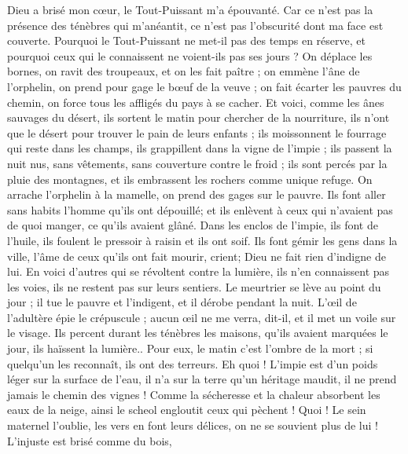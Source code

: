 \begin{multicols}{2}
Dieu a brisé mon cœur, le Tout-Puissant m'a épouvanté.
Car ce n'est pas la présence des ténèbres qui m'anéantit, ce n'est pas l'obscurité dont ma face est couverte.
\VerseOne{}Pourquoi le Tout-Puissant ne met-il pas des temps en réserve, et pourquoi ceux qui le connaissent ne voient-ils pas ses jours ?
On déplace les bornes, on ravit des troupeaux, et on les fait paître ;
on emmène l'âne de l'orphelin, on prend pour gage le bœuf de la veuve ;
on fait écarter les pauvres du chemin, on force tous les affligés du pays à se cacher.
Et voici, comme les ânes sauvages du désert, ils sortent le matin pour chercher de la nourriture, ils n'ont que le désert pour trouver le pain de leurs enfants ;
ils moissonnent le fourrage qui reste dans les champs, ils grappillent dans la vigne de l'impie ;
ils passent la nuit nus, sans vêtements, sans couverture contre le froid ;
ils sont percés par la pluie des montagnes, et ils embrassent les rochers comme unique refuge.
On arrache l'orphelin à la mamelle, on prend des gages sur le pauvre.
Ils font aller sans habits l'homme qu'ils ont dépouillé; et ils enlèvent à ceux qui n'avaient pas de quoi manger, ce qu'ils avaient glâné.
Dans les enclos de l'impie, ils font de l'huile, ils foulent le pressoir à raisin et ils ont soif.
Ils font gémir les gens dans la ville, l'âme de ceux qu'ils ont fait mourir, crient; Dieu ne fait rien d'indigne de lui.
En voici d'autres qui se révoltent contre la lumière, ils n'en connaissent pas les voies, ils ne restent pas sur leurs sentiers.
Le meurtrier se lève au point du jour ; il tue le pauvre et l'indigent, et il dérobe pendant la nuit.
L'œil de l'adultère épie le crépuscule ; aucun œil ne me verra, dit-il, et il met un voile sur le visage.
Ils percent durant les ténèbres les maisons, qu'ils avaient marquées le jour, ils haïssent la lumière..
Pour eux, le matin c'est l'ombre de la mort ; si quelqu'un les reconnaît, ils ont des terreurs.
Eh quoi ! L'impie est d'un poids léger sur la surface de l'eau, il n'a sur la terre qu'un héritage maudit, il ne prend jamais le chemin des vignes !
Comme la sécheresse et la chaleur absorbent les eaux de la neige, ainsi le scheol engloutit ceux qui pèchent !
Quoi ! Le sein maternel l'oublie, les vers en font leurs délices, on ne se souvient plus de lui ! L'injuste est brisé comme du bois,

\end{multicols}
